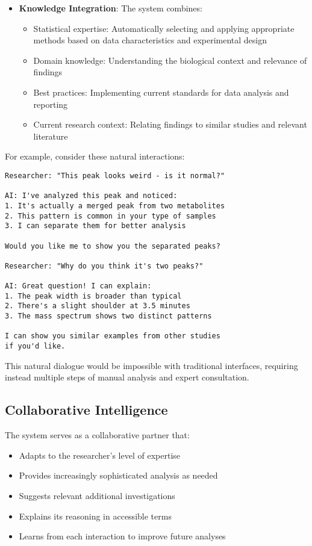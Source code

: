 \documentclass[11pt,a4paper]{article}
\begin{document}
\begin{itemize}
    \item \textbf{Knowledge Integration}: The system combines:
    \begin{itemize}
        \item Statistical expertise: Automatically selecting and applying appropriate methods based on data characteristics and experimental design
        \item Domain knowledge: Understanding the biological context and relevance of findings
        \item Best practices: Implementing current standards for data analysis and reporting
        \item Current research context: Relating findings to similar studies and relevant literature
    \end{itemize}
\end{itemize}

For example, consider these natural interactions:
\begin{verbatim}
Researcher: "This peak looks weird - is it normal?"

AI: I've analyzed this peak and noticed:
1. It's actually a merged peak from two metabolites
2. This pattern is common in your type of samples
3. I can separate them for better analysis

Would you like me to show you the separated peaks?

Researcher: "Why do you think it's two peaks?"

AI: Great question! I can explain:
1. The peak width is broader than typical
2. There's a slight shoulder at 3.5 minutes
3. The mass spectrum shows two distinct patterns

I can show you similar examples from other studies
if you'd like.
\end{verbatim}

This natural dialogue would be impossible with traditional interfaces, requiring instead multiple steps of manual analysis and expert consultation.

\subsection{Collaborative Intelligence}
The system serves as a collaborative partner that:
\begin{itemize}
    \item Adapts to the researcher's level of expertise
    \item Provides increasingly sophisticated analysis as needed
    \item Suggests relevant additional investigations
    \item Explains its reasoning in accessible terms
    \item Learns from each interaction to improve future analyses
\end{itemize}
\end{document}
